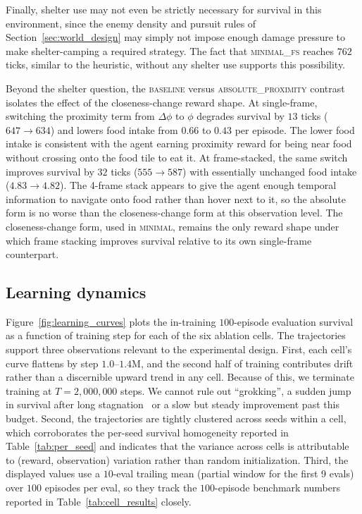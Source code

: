 \documentclass[12pt,a4paper,titlepage]{article}
\begin{document}
Finally, shelter use may not even be strictly necessary for survival in this environment, since the enemy density and pursuit rules of Section~\ref{sec:world_design} may simply not impose enough damage pressure to make shelter-camping a required strategy. The fact that \textsc{minimal\_fs} reaches $762$ ticks, similar to the heuristic, without any shelter use supports this possibility.

Beyond the shelter question, the \textsc{baseline} versus \textsc{absolute\_proximity} contrast isolates the effect of the closeness-change reward shape. At single-frame, switching the proximity term from $\Delta\phi$ to $\phi$ degrades survival by $13$ ticks ($647 \to 634$) and lowers food intake from $0.66$ to $0.43$ per episode. The lower food intake is consistent with the agent earning proximity reward for being near food without crossing onto the food tile to eat it. At frame-stacked, the same switch improves survival by $32$ ticks ($555 \to 587$) with essentially unchanged food intake ($4.83 \to 4.82$). The 4-frame stack appears to give the agent enough temporal information to navigate onto food rather than hover next to it, so the absolute form is no worse than the closeness-change form at this observation level. The closeness-change form, used in \textsc{minimal}, remains the only reward shape under which frame stacking improves survival relative to its own single-frame counterpart.

\subsection{Learning dynamics}
\label{sec:learning_dynamics}

Figure~\ref{fig:learning_curves} plots the in-training $100$-episode evaluation survival as a function of training step for each of the six ablation cells. The trajectories support three observations relevant to the experimental design. First, each cell's curve flattens by step $1.0$--$1.4$M, and the second half of training contributes drift rather than a discernible upward trend in any cell. Because of this, we terminate training at $T = 2{,}000{,}000$ steps. We cannot rule out ``grokking'', a sudden jump in survival after long stagnation~\citep{Power2022} or a slow but steady improvement past this budget. Second, the trajectories are tightly clustered across seeds within a cell, which corroborates the per-seed survival homogeneity reported in Table~\ref{tab:per_seed} and indicates that the variance across cells is attributable to (reward, observation) variation rather than random initialization. Third, the displayed values use a $10$-eval trailing mean (partial window for the first 9 evals) over $100$ episodes per eval, so they track the $100$-episode benchmark numbers reported in Table~\ref{tab:cell_results} closely.
\end{document}
